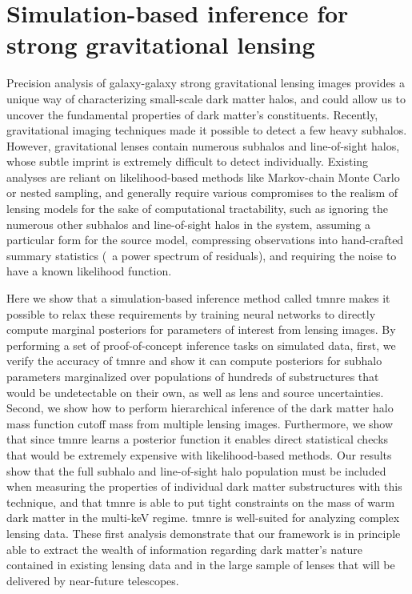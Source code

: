 \chapter{Simulation-based inference for strong gravitational lensing} \label{cha:lensing}


Precision analysis of galaxy-galaxy strong gravitational lensing images provides a unique way of characterizing small-scale dark matter halos, and could allow us to uncover the fundamental properties of dark matter's constituents. Recently, gravitational imaging techniques made it possible to detect a few heavy subhalos. However, gravitational lenses contain numerous subhalos and line-of-sight halos, whose subtle imprint is extremely difficult to detect individually. Existing analyses are reliant on likelihood-based methods like Markov-chain Monte Carlo or nested sampling, and generally require various compromises to the realism of lensing models for the sake of computational tractability, such as ignoring the numerous other subhalos and line-of-sight halos in the system, assuming a particular form for the source model, compressing observations into hand-crafted summary statistics (\eg~a power spectrum of residuals), and requiring the noise to have a known likelihood function. 

Here we show that a simulation-based inference method called \gls*{tmnre} makes it possible to relax these requirements by training neural networks to directly compute marginal posteriors for parameters of interest from lensing images. By performing a set of proof-of-concept inference tasks on simulated data, first, we verify the accuracy of \gls*{tmnre} and show it can compute posteriors for subhalo parameters marginalized over populations of hundreds of substructures that would be undetectable on their own, as well as lens and source uncertainties. Second, we show how to perform hierarchical inference of the dark matter halo mass function cutoff mass from multiple lensing images. Furthermore, we show that since \gls*{tmnre} learns a posterior function it enables direct statistical checks that would be extremely expensive with likelihood-based methods. Our results show that the full subhalo and line-of-sight halo population must be included when measuring the properties of individual dark matter substructures with this technique, and that \gls*{tmnre} is able to put tight constraints on the mass of warm dark matter in the multi-keV regime. \gls*{tmnre} is well-suited for analyzing complex lensing data. These first analysis demonstrate that our framework is in principle able to extract the wealth of information regarding dark matter’s nature contained in existing lensing data and in the large sample of lenses that will be delivered by near-future telescopes.


